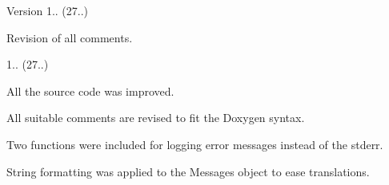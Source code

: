 \begin{DoxyVersion}{Version}
1.. (27..)
\begin{DoxyItemize}
\item Revision of all comments. 
\end{DoxyItemize}

1.. (27..)
\begin{DoxyItemize}
\item All the source code was improved.
\item All suitable comments are revised to fit the Doxygen syntax.
\item Two functions were included for logging error messages instead of the stderr.
\item String formatting was applied to the Messages object to ease translations. 
\end{DoxyItemize}
\end{DoxyVersion}
